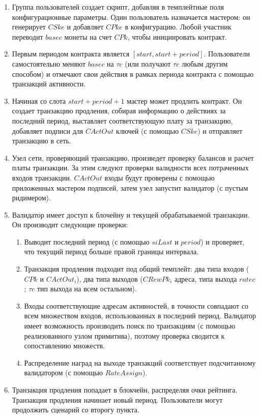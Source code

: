 \documentclass[specification,annotation]{itmo-student-thesis}
\begin{document}
\begin{enumerate}
\item Группа пользователей создает скрипт, добавляя в темплейтные поля
  конфигурационные параметры. Один пользователь назначается мастером:
  он генерирует $CSke$ и добавляет $CPke$ в конфигурацию. Любой
  участник переводит $basec$ монеты на счет $CPk$, чтобы инициировать
  контракт.
\item Первым периодом контракта является $[start,
  start+period]$. Пользователи самостоятельно меняют $basec$ на $\tau
  c$ (или получают $\tau c$ любым другим способом) и отмечают свои
  действия в рамках периода контракта с помощью транзакций активности.
\item Начиная со слота $start + period + 1$ мастер может продлить
  контракт. Он создает транзакцию продления, собирая информацию о
  действиях за последний период, выставляет соответствующую плату за
  транзакцию, добавляет подписи для $CActOut$ ключей (с помощью
  $CSke$) и отправляет транзакцию в сеть.
\item Узел сети, проверяющий транзакцию, произведет проверку балансов
  и расчет платы транзакции. За этим следуют проверки валидности всех
  потраченных входов транзакции. $CActOut$ входы будут проверены с
  помощью приложенных мастером подписей, затем узел запустит валидатор
  (с пустым ридимером).
\item Валидатор имеет доступ к блочейну и текущей обрабатываемой
  транзакции. Он производит следующие проверки:
  \begin{enumerate}
  \item Выводит последний период (с помощью $siLast$ и $period$) и
    проверяет, что текущий период больше правой границы интервала.
  \item Транзакция продления подходит под общий темплейт: два типа
    входов ($CPk$ и $CActOut_i$), два типа выходов ($CRewPk_i$ адреса,
    типа выхода $ratec$; $\tau c$ тип выхода на всем остальном).
  \item Входы соответствующие адресам активностей, в точности
    совпадают со всем множеством входов, использованных в последний
    период. Валидатор имеет возможность производить поиск по
    транзакциям (с помощью реализованного узлом примитива), поэтому
    проверка сводится к сопоставлению множеств.
  \item Распределение наград на выходе транзакций соответствует
    подсчитанному валидатором (с помощью $RateAssign$).
  \end{enumerate}
\item Транзакция продления попадает в блокчейн, распределяя очки
  рейтинга. Транзакция продления начинает новый период. Пользователи
  могут продолжить сценарий со второгу пункта.
\end{enumerate}
\end{document}
